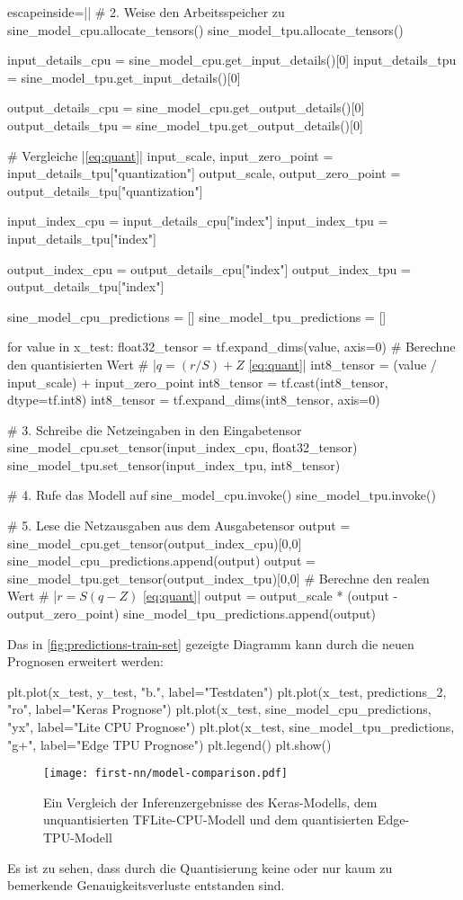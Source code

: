 \begin{pythoncode*}{escapeinside=||}
# 2. Weise den Arbeitsspeicher zu
sine_model_cpu.allocate_tensors()
sine_model_tpu.allocate_tensors()

input_details_cpu = sine_model_cpu.get_input_details()[0]
input_details_tpu = sine_model_tpu.get_input_details()[0]

output_details_cpu = sine_model_cpu.get_output_details()[0]
output_details_tpu = sine_model_tpu.get_output_details()[0]

# Vergleiche |\autoref{eq:quant}|
input_scale, input_zero_point = input_details_tpu["quantization"]
output_scale, output_zero_point = output_details_tpu["quantization"]

input_index_cpu = input_details_cpu["index"]
input_index_tpu = input_details_tpu["index"]

output_index_cpu = output_details_cpu["index"]
output_index_tpu = output_details_tpu["index"]

sine_model_cpu_predictions = []
sine_model_tpu_predictions = []

for value in x_test:
    float32_tensor = tf.expand_dims(value, axis=0)
    # Berechne den quantisierten Wert
    # |$q = (r / S) + Z$ \eqref{eq:quant}|
    int8_tensor = (value / input_scale) + input_zero_point
    int8_tensor = tf.cast(int8_tensor, dtype=tf.int8)
    int8_tensor = tf.expand_dims(int8_tensor, axis=0)
    
    # 3. Schreibe die Netzeingaben in den Eingabetensor
    sine_model_cpu.set_tensor(input_index_cpu, float32_tensor)
    sine_model_tpu.set_tensor(input_index_tpu, int8_tensor)

    # 4. Rufe das Modell auf
    sine_model_cpu.invoke()
    sine_model_tpu.invoke()
    
    # 5. Lese die Netzausgaben aus dem Ausgabetensor
    output = sine_model_cpu.get_tensor(output_index_cpu)[0,0]
    sine_model_cpu_predictions.append(output)
    output = sine_model_tpu.get_tensor(output_index_tpu)[0,0]
    # Berechne den realen Wert
    # |$r = S(q - Z)$ \eqref{eq:quant}|
    output = output_scale * (output - output_zero_point) 
    sine_model_tpu_predictions.append(output)
\end{pythoncode*}
Das in \autoref{fig:predictions-train-set} gezeigte Diagramm kann
durch die neuen Prognosen erweitert werden:
\begin{pythoncode}
plt.plot(x_test, y_test, "b.", label="Testdaten")
plt.plot(x_test, predictions_2, "ro", label="Keras Prognose")
plt.plot(x_test, sine_model_cpu_predictions, "yx", label="Lite CPU Prognose")
plt.plot(x_test, sine_model_tpu_predictions, "g+", label="Edge TPU Prognose")
plt.legend()
plt.show()
\end{pythoncode}
\newpage
\begin{figure}[h!]
  \centering
  \texttt{[image: first-nn/model-comparison.pdf]}
  \caption{Ein Vergleich der Inferenzergebnisse des Keras-Modells, dem unquantisierten
  TFLite-CPU-Modell und dem quantisierten Edge-TPU-Modell}
  \label{fig:model-comparison}
\end{figure}
\noindent
Es ist zu sehen, dass durch die Quantisierung keine oder nur kaum
zu bemerkende Genauigkeitsverluste entstanden sind.

